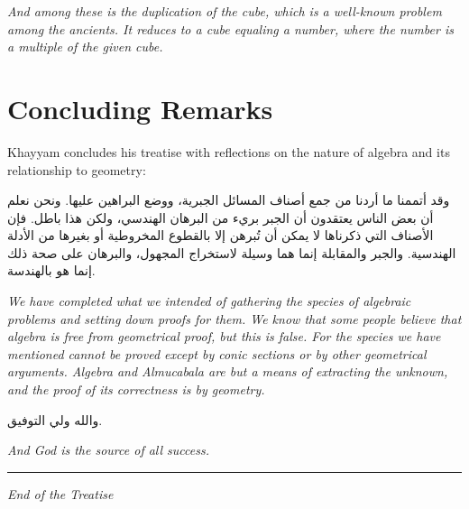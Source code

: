 \textit{And among these is the duplication of the cube, which is a well-known problem among the ancients. It reduces to a cube equaling a number, where the number is a multiple of the given cube.}
\clearpage

\section{Concluding Remarks}

\label{sec:conclusion}


Khayyam concludes his treatise with reflections on the nature of algebra and its relationship to geometry:

\begin{Arabic}
وقد أتممنا ما أردنا من جمع أصناف المسائل الجبرية، ووضع البراهين عليها. ونحن نعلم أن بعض الناس يعتقدون أن الجبر بريء من البرهان الهندسي، ولكن هذا باطل. فإن الأصناف التي ذكرناها لا يمكن أن تُبرهن إلا بالقطوع المخروطية أو بغيرها من الأدلة الهندسية. والجبر والمقابلة إنما هما وسيلة لاستخراج المجهول، والبرهان على صحة ذلك إنما هو بالهندسة.

\end{Arabic}

\textit{We have completed what we intended of gathering the species of algebraic problems and setting down proofs for them.
We know that some people believe that algebra is free from geometrical proof, but this is false.
For the species we have mentioned cannot be proved except by conic sections or by other geometrical arguments.
Algebra and Almucabala are but a means of extracting the unknown, and the proof of its correctness is by geometry.}
\vspace{0.5cm}

\begin{Arabic}
والله ولي التوفيق.

\end{Arabic}

\textit{And God is the source of all success.}
\vspace{1cm}

\begin{center}
{
\color{rulecolor}
\rule{0.6\textwidth}{0.8pt}}

{\small
\textit{End of the Treatise}}

\end{center}

